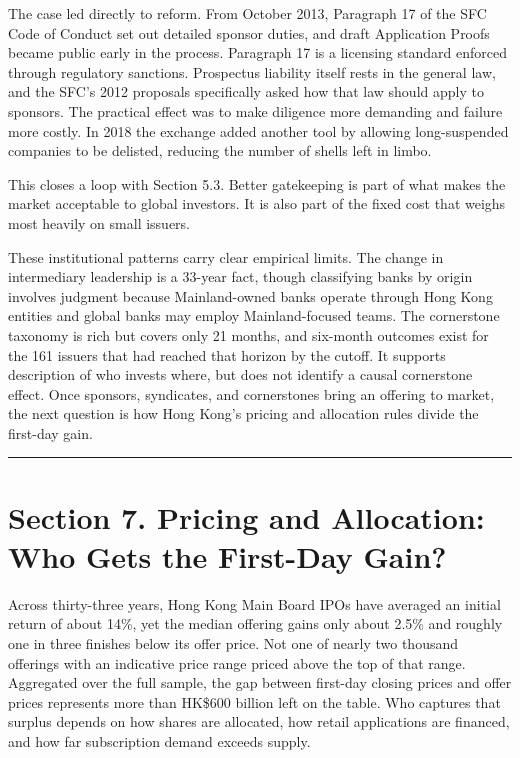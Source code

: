 \documentclass[11pt,letterpaper]{article}
\begin{document}
The case led directly to reform. From October 2013, Paragraph 17 of the SFC Code of Conduct set out detailed sponsor duties, and draft Application Proofs became public early in the process. Paragraph 17 is a licensing standard enforced through regulatory sanctions. Prospectus liability itself rests in the general law, and the SFC's 2012 proposals specifically asked how that law should apply to sponsors. The practical effect was to make diligence more demanding and failure more costly. In 2018 the exchange added another tool by allowing long-suspended companies to be delisted, reducing the number of shells left in limbo.

This closes a loop with Section 5.3. Better gatekeeping is part of what makes the market acceptable to global investors. It is also part of the fixed cost that weighs most heavily on small issuers.

These institutional patterns carry clear empirical limits. The change in intermediary leadership is a 33-year fact, though classifying banks by origin involves judgment because Mainland-owned banks operate through Hong Kong entities and global banks may employ Mainland-focused teams. The cornerstone taxonomy is rich but covers only 21 months, and six-month outcomes exist for the 161 issuers that had reached that horizon by the cutoff. It supports description of who invests where, but does not identify a causal cornerstone effect. Once sponsors, syndicates, and cornerstones bring an offering to market, the next question is how Hong Kong's pricing and allocation rules divide the first-day gain.

\par\medskip\noindent\rule{\linewidth}{0.35pt}\par\medskip
\section*{\texorpdfstring{Section 7. Pricing and Allocation: Who Gets the First-Day Gain?}{Section 7. Pricing and Allocation: Who Gets the First-Day Gain?}}
Across thirty-three years, Hong Kong Main Board IPOs have averaged an initial return of about 14\%, yet the median offering gains only about 2.5\% and roughly one in three finishes below its offer price. Not one of nearly two thousand offerings with an indicative price range priced above the top of that range. Aggregated over the full sample, the gap between first-day closing prices and offer prices represents more than HK\$600 billion left on the table. Who captures that surplus depends on how shares are allocated, how retail applications are financed, and how far subscription demand exceeds supply.
\end{document}
